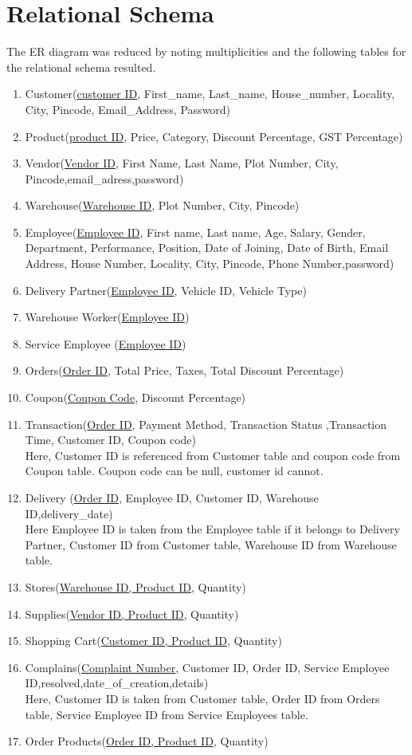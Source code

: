 \documentclass[12pt]{report}
\begin{document}
\chapter{Relational Schema}
The ER diagram was reduced by noting multiplicities and the following tables for the relational schema resulted.

\begin{enumerate}
	\item Customer(\underline{customer ID}, First\_name, Last\_name, House\_number, Locality, City, Pincode, Email\_Address, Password)
	\item Product(\underline{product ID}, Price, Category, Discount Percentage, GST Percentage)
	\item Vendor(\underline{Vendor ID}, First Name, Last Name, Plot Number, City, Pincode,email\_adress,password)
	\item Warehouse(\underline{Warehouse ID}, Plot Number, City, Pincode)
	\item Employee(\underline{Employee ID}, First name, Last name, Age, Salary, Gender, Department, Performance, Position, Date of Joining, Date of Birth, Email Address, House Number, Locality, City, Pincode, Phone Number,password)
	\item Delivery Partner(\underline{Employee ID}, Vehicle ID, Vehicle Type)
	\item Warehouse Worker(\underline{Employee ID})
	\item Service Employee (\underline{Employee ID})
	\item Orders(\underline{Order ID}, Total Price, Taxes, Total Discount Percentage)
	\item Coupon(\underline{Coupon Code}, Discount Percentage)
	\item Transaction(\underline{Order ID}, Payment Method, Transaction Status ,Transaction Time, Customer ID, Coupon code)\\ Here, Customer ID is referenced from Customer table and coupon code from Coupon table. Coupon code can be null, customer id cannot.
	\item Delivery (\underline{Order ID}, Employee ID, Customer ID, Warehouse ID,delivery\_date) \\ Here Employee ID is taken from the Employee table if it belongs to Delivery Partner, Customer ID from Customer table, Warehouse ID from Warehouse table.
	\item Stores(\underline{Warehouse ID, Product ID}, Quantity)
	\item Supplies(\underline{Vendor ID, Product ID}, Quantity)
	\item Shopping Cart(\underline{Customer ID, Product ID}, Quantity)
	\item Complains(\underline{Complaint Number}, Customer ID, Order ID, Service Employee ID,resolved,date\_of\_creation,details)\\ Here, Customer ID is taken from Customer table, Order ID from Orders table, Service Employee ID from Service Employees table.
	\item Order Products(\underline{Order ID, Product ID}, Quantity)

\end{enumerate}
\end{document}

